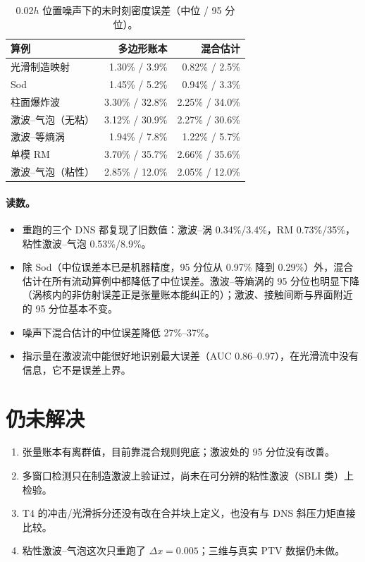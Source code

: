 \begin{table}[!htbp]\centering\small\caption{0.02$h$ 位置噪声下的末时刻密度误差（中位 / 95 分位）。}
\begin{tabularx}{0.85\linewidth}{@{}L r r@{}}\toprule
算例 & 多边形账本 & 混合估计\\\midrule
光滑制造映射 & 1.30\% / 3.9\% & 0.82\% / 2.5\%\\
Sod & 1.45\% / 5.2\% & 0.94\% / 3.3\%\\
柱面爆炸波 & 3.30\% / 32.8\% & 2.25\% / 34.0\%\\
激波–气泡（无粘） & 3.12\% / 30.9\% & 2.27\% / 30.6\%\\
激波–等熵涡 & 1.94\% / 7.8\% & 1.22\% / 5.7\%\\
单模 RM & 3.70\% / 35.7\% & 2.66\% / 35.6\%\\
激波–气泡（粘性） & 2.85\% / 12.0\% & 2.05\% / 12.0\%\\
\bottomrule\end{tabularx}\end{table}
\paragraph{读数。}
\begin{itemize}
\item 重跑的三个 DNS 都复现了旧数值：激波–涡 0.34\%/3.4\%，RM 0.73\%/35\%，粘性激波–气泡 0.53\%/8.9\%。
\item 除 Sod（中位误差本已是机器精度，95 分位从 0.97\% 降到 0.29\%）外，混合估计在所有流动算例中都降低了中位误差。激波–等熵涡的 95 分位也明显下降（涡核内的非仿射误差正是张量账本能纠正的）；激波、接触间断与界面附近的 95 分位基本不变。
\item 噪声下混合估计的中位误差降低 27\%–37\%。
\item 指示量在激波流中能很好地识别最大误差（AUC 0.86–0.97），在光滑流中没有信息，它不是误差上界。
\end{itemize}

\section{仍未解决}
\begin{enumerate}
\item 张量账本有离群值，目前靠混合规则兜底；激波处的 95 分位没有改善。
\item 多窗口检测只在制造激波上验证过，尚未在可分辨的粘性激波（SBLI 类）上检验。
\item T4 的冲击/光滑拆分还没有改在合并块上定义，也没有与 DNS 斜压力矩直接比较。
\item 粘性激波–气泡这次只重跑了 $\Delta x=0.005$；三维与真实 PTV 数据仍未做。
\end{enumerate}

